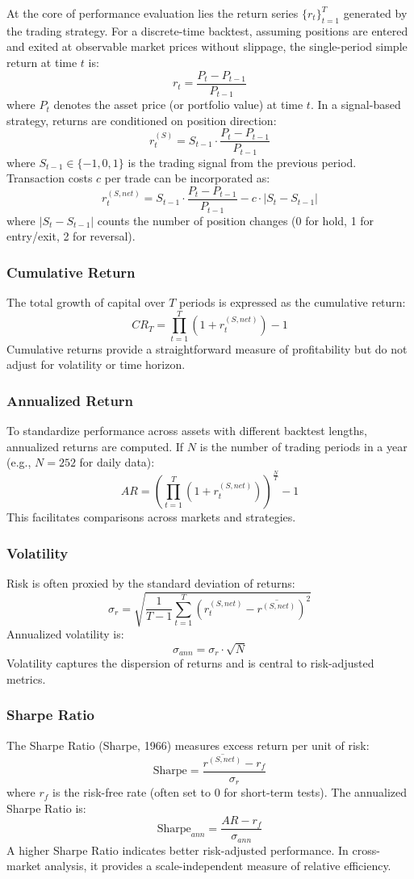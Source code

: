 At the core of performance evaluation lies the return series $\{r_t\}_{t=1}^T$ generated by the trading strategy. For a discrete-time backtest, assuming positions are entered and exited at observable market prices without slippage, the single-period simple return at time $t$ is:
\[
r_t = \frac{P_t - P_{t-1}}{P_{t-1}}
\]
where $P_t$ denotes the asset price (or portfolio value) at time $t$. In a signal-based strategy, returns are conditioned on position direction:
\[
r_t^{(S)} = S_{t-1} \cdot \frac{P_t - P_{t-1}}{P_{t-1}}
\]
where $S_{t-1} \in \{-1, 0, 1\}$ is the trading signal from the previous period. Transaction costs $c$ per trade can be incorporated as:
\[
r_t^{(S,net)} = S_{t-1} \cdot \frac{P_t - P_{t-1}}{P_{t-1}} - c \cdot |S_t - S_{t-1}|
\]
where $|S_t - S_{t-1}|$ counts the number of position changes (0 for hold, 1 for entry/exit, 2 for reversal).

\subsubsection{Cumulative Return}  
The total growth of capital over $T$ periods is expressed as the cumulative return:
\[
CR_T = \prod_{t=1}^T (1 + r_t^{(S,net)}) - 1
\]
Cumulative returns provide a straightforward measure of profitability but do not adjust for volatility or time horizon.

\subsubsection{Annualized Return}  
To standardize performance across assets with different backtest lengths, annualized returns are computed. If $N$ is the number of trading periods in a year (e.g., $N=252$ for daily data):
\[
AR = \left( \prod_{t=1}^T (1 + r_t^{(S,net)}) \right)^{\frac{N}{T}} - 1
\]
This facilitates comparisons across markets and strategies.

\subsubsection{Volatility}  
Risk is often proxied by the standard deviation of returns:
\[
\sigma_r = \sqrt{\frac{1}{T-1} \sum_{t=1}^T \left(r_t^{(S,net)} - \overline{r^{(S,net)}}\right)^2}
\]
Annualized volatility is:
\[
\sigma_{ann} = \sigma_r \cdot \sqrt{N}
\]
Volatility captures the dispersion of returns and is central to risk-adjusted metrics.

\subsubsection{Sharpe Ratio}  
The Sharpe Ratio (Sharpe, 1966) measures excess return per unit of risk:
\[
\text{Sharpe} = \frac{\overline{r^{(S,net)}} - r_f}{\sigma_r}
\]
where $r_f$ is the risk-free rate (often set to 0 for short-term tests). The annualized Sharpe Ratio is:
\[
\text{Sharpe}_{ann} = \frac{AR - r_f}{\sigma_{ann}}
\]
A higher Sharpe Ratio indicates better risk-adjusted performance. In cross-market analysis, it provides a scale-independent measure of relative efficiency.

